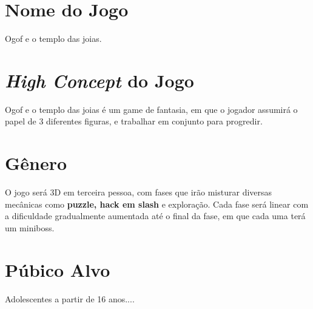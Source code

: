 \section{Nome do Jogo}
Ogof e o templo das joias.

\section{\textit{High Concept} do Jogo}
Ogof e o templo das joias é um game de fantasia, em que o jogador assumirá o papel de 3 diferentes figuras, e trabalhar em conjunto para progredir.



\section{Gênero}

O jogo será 3D em terceira pessoa, com fases que irão misturar diversas mecânicas como \textbf{puzzle, hack em slash} e exploração. Cada fase será linear com a dificuldade gradualmente aumentada até o final da fase, em que cada uma terá um miniboss.


\section{Púbico Alvo}

Adolescentes a partir de 16 anos....
\vfill
\pagebreak

